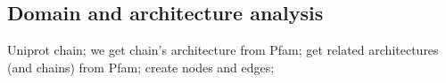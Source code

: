 


\subsection{Domain and architecture analysis}
Uniprot chain; we get chain's architecture from Pfam; get related architectures (and chains) from Pfam; create nodes and edges;

